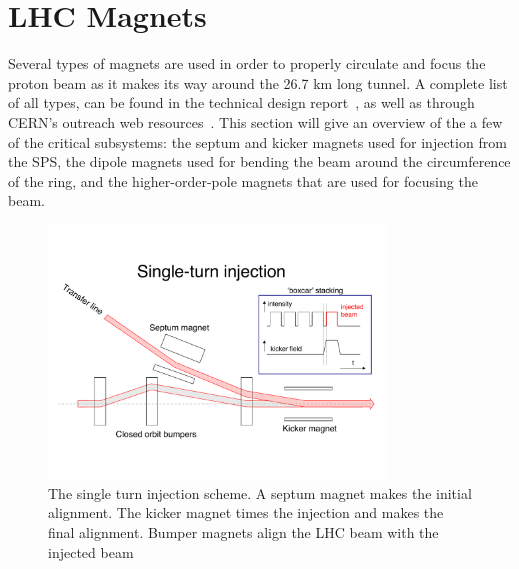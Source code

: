 \section{LHC Magnets}
\label{lhc_magnets}

\par Several types of magnets are used in order to properly circulate
and focus the proton beam as it makes its way around the 26.7 km long
tunnel.  A complete list of all types, can be found in the technical
design report~\cite{LHC:TDR_Vol1_MainRing_Brüning}, as well as through
CERN's outreach web
resources~\cite{LHC:LHC_outreach_listOfAllMagnets}.  This section will
give an overview of the a few of the critical subsystems: the septum
and kicker magnets used for injection from the SPS, the dipole magnets
used for bending the beam around the circumference of the ring, and
the higher-order-pole magnets that are used for focusing the beam.  

\begin{figure}[h]
   \centering
  \includegraphics[width=0.8\textwidth]{Figures/LHC_Diagrams/LHC_SingleTurnInjection.pdf}
  \caption{The single turn injection scheme.  A septum magnet makes
    the initial alignment.  The kicker magnet times the injection and
    makes the final alignment.  Bumper magnets align the LHC beam with
  the injected beam \cite{LHC:LHC_kickers_Barnes}} \label{fig:lhc_singleTurnInjection}
\end{figure}

